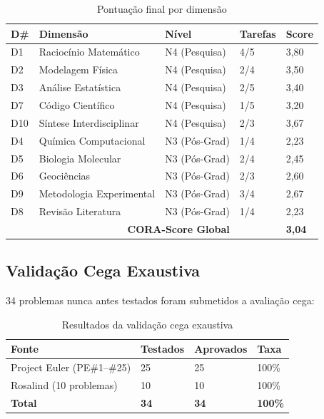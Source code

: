 \documentclass[12pt,a4paper,oneside]{article}
\begin{document}
\begin{table}[H]\centering\footnotesize
\caption{Pontuação final por dimensão}
\label{tab:scores}
\begin{tabular}{p{}p{}p{}p{}p{}}
\toprule
\textbf{D\#} & \textbf{Dimensão} & \textbf{Nível} & \textbf{Tarefas} & \textbf{Score} \\
\midrule
D1 & Raciocínio Matemático & N4 (Pesquisa) & 4/5 & 3,80 \\
D2 & Modelagem Física & N4 (Pesquisa) & 2/4 & 3,50 \\
D3 & Análise Estatística & N4 (Pesquisa) & 2/5 & 3,40 \\
D7 & Código Científico & N4 (Pesquisa) & 1/5 & 3,20 \\
D10 & Síntese Interdisciplinar & N4 (Pesquisa) & 2/3 & 3,67 \\
D4 & Química Computacional & N3 (Pós-Grad) & 1/4 & 2,23 \\
D5 & Biologia Molecular & N3 (Pós-Grad) & 2/4 & 2,45 \\
D6 & Geociências & N3 (Pós-Grad) & 2/3 & 2,60 \\
D9 & Metodologia Experimental & N3 (Pós-Grad) & 3/4 & 2,67 \\
D8 & Revisão Literatura & N3 (Pós-Grad) & 1/4 & 2,23 \\
\midrule
\multicolumn{3}{r}{\textbf{CORA-Score Global}} & & \textbf{3,04} \\
\bottomrule
\end{tabular}
\end{table}

\subsection{Validação Cega Exaustiva}

34 problemas nunca antes testados foram submetidos a avaliação cega:

\begin{table}[H]\centering\footnotesize
\caption{Resultados da validação cega exaustiva}
\label{tab:blind}
\begin{tabular}{p{}p{}p{}p{}}
\toprule
\textbf{Fonte} & \textbf{Testados} & \textbf{Aprovados} & \textbf{Taxa} \\
\midrule
Project Euler (PE\#1--\#25) & 25 & 25 & 100\% \\
Rosalind (10 problemas) & 10 & 10 & 100\% \\
\midrule
\textbf{Total} & \textbf{34} & \textbf{34} & \textbf{100\%} \\
\bottomrule
\end{tabular}
\end{table}
\end{document}
